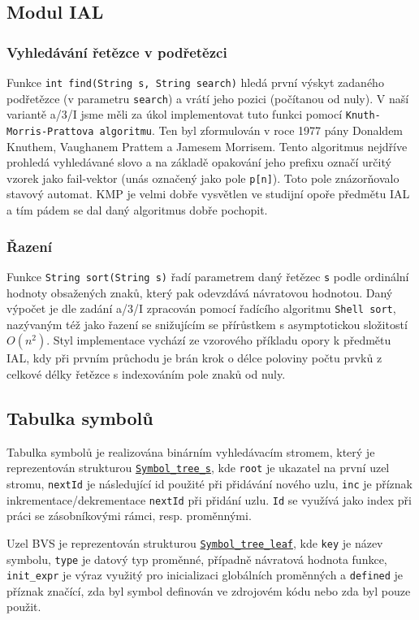 \documentclass[a4paper,11pt]{article}
\begin{document}
\subsection {Modul IAL}
\subsubsection {Vyhledávání řetězce v podřetězci}
Funkce \texttt{int find(String s, String search)} hledá první výskyt zadaného podřetězce (v parametru \texttt{search}) a vrátí jeho pozici (počítanou od nuly). V naší variantě a/3/I jsme měli za úkol implementovat tuto funkci pomocí \texttt{Knuth-Morris-Prattova algoritmu}. Ten byl zformulován v roce 1977 pány Donaldem Knuthem, Vaughanem Prattem a Jamesem Morrisem. Tento algoritmus nejdříve prohledá vyhledávané slovo a na základě opakování jeho prefixu označí určitý vzorek jako fail-vektor (unás označený jako pole \texttt{p[n]}). Toto pole znázorňovalo stavový automat. KMP je velmi dobře vysvětlen ve studijní opoře předmětu IAL a tím pádem se dal daný algoritmus dobře pochopit.

\subsubsection {Řazení}
Funkce \texttt{String sort(String s)} řadí parametrem daný řetězec \texttt{s} podle ordinální hodnoty obsažených znaků, který pak odevzdává návratovou hodnotou. Daný výpočet je dle zadání a/3/I zpracován pomocí řadícího algoritmu \texttt{Shell sort}, nazývaným též jako řazení se snižujícím se přírůstkem s asymptotickou složitostí~$O(n^{2})$. Styl implementace vychází ze vzorového příkladu opory k předmětu IAL, kdy při prvním průchodu je brán krok o délce poloviny počtu prvků z celkové délky řetězce s indexováním pole znaků od nuly.

\subsection{Tabulka symbolů}
Tabulka symbolů je realizována binárním vyhledávacím stromem, který je reprezentován strukturou \hyperref[lst:stBvsStruct]{\texttt{Symbol\_tree\_s}}, kde \texttt{root} je ukazatel na první uzel stromu, \texttt{nextId} je následující id použité při přidávání nového uzlu, \texttt{inc} je příznak inkrementace/dekrementace \texttt{nextId} při přidání uzlu. \texttt{Id} se využívá jako index při práci se zásobníkovými rámci, resp. proměnnými.

Uzel BVS je reprezentován strukturou \hyperref[lst:stBvsLeafStruct]{\texttt{Symbol\_tree\_leaf}}, kde \texttt{key} je název symbolu, \texttt{type} je datový typ proměnné, případně návratová hodnota funkce, \texttt{init\_expr} je výraz využitý pro inicializaci globálních proměnných a \texttt{defined} je příznak značící, zda byl symbol definován ve zdrojovém kódu nebo zda byl pouze použit.
\end{document}
